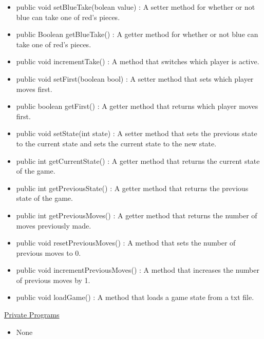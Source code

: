 \documentclass[12pt]{article}
\begin{document}
\begin{itemize}
\begin{itemize}
		\item public void setBlueTake(bolean value) : A setter method for whether or not blue can take one of red’s pieces.
		\item public Boolean getBlueTake() : A getter method for whether or not blue can take one of red’s pieces.
		\item public void incrementTake() : A method that switches which player is active.
		\item public void setFirst(boolean bool) : A setter method that sets which player moves first.
		\item public boolean getFirst() : A getter method that returns which player moves first.
		\item public void setState(int state) : A setter method that sets the previous state to the current state and sets the current state to the new state.
		\item public int getCurrentState() : A getter method that returns the current state of the game.
		\item public int getPreviousState() : A getter method that returns the previous state of the game.
		\item public int getPreviousMoves() : A getter method that returns the number of moves previously made.
		\item public void resetPreviousMoves() : A method that sets the number of previous moves to 0.
		\item public void incrementPreviousMoves() : A method that increases the number of previous moves by 1.
		\item public void loadGame() : A method that loads a game state from a txt file.
		
	\end{itemize}
	\underline{Private Programs}
	\begin{itemize}
		\item None
	\end{itemize}
\end{itemize}
\end{document}
